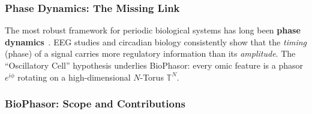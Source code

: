 \documentclass[preprint,12pt,amsmath,amssymb,superscriptaddress,floatfix]{revtex4-2}
\newcommand{\torus}{\mathbb{T}}
\begin{document}
\subsubsection{Phase Dynamics: The Missing Link}

The most robust framework for periodic biological systems has long been
\textbf{phase dynamics}~\cite{ref_021,ref_022,ref_023,ref_027,ref_028,ref_030}.
EEG studies and circadian biology consistently show that the \emph{timing}
(phase) of a signal carries more regulatory information than its
\emph{amplitude}.
The ``Oscillatory Cell'' hypothesis underlies BioPhasor: every omic feature
is a phasor $e^{i\phi}$ rotating on a high-dimensional $N$-Torus $\torus^N$.

\subsubsection{BioPhasor: Scope and Contributions}
\end{document}
